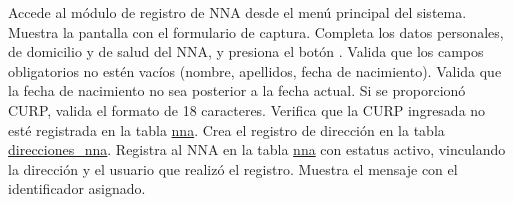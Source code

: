 \begin{UCtrayectoria}
	\UCpaso[\UCactor] Accede al módulo de registro de NNA desde el menú principal del sistema.
	\UCpaso Muestra la pantalla  con el formulario de captura.
	\UCpaso[\UCactor] \label{CU-13.ingresaDatos} Completa los datos personales, de domicilio y de salud del NNA, y presiona el botón .
	\UCpaso Valida que los campos obligatorios no estén vacíos (nombre, apellidos, fecha de nacimiento). 
	\UCpaso Valida que la fecha de nacimiento no sea posterior a la fecha actual. 
	\UCpaso Si se proporcionó CURP, valida el formato de 18 caracteres. 
	\UCpaso Verifica que la CURP ingresada no esté registrada en la tabla \hyperlink{NNA}{nna}. 
	\UCpaso Crea el registro de dirección en la tabla \hyperlink{Direcciones}{direcciones\_nna}.
	\UCpaso Registra al NNA en la tabla \hyperlink{NNA}{nna} con estatus activo, vinculando la dirección y el usuario que realizó el registro.
	\UCpaso Muestra el mensaje  con el identificador asignado.
\end{UCtrayectoria}
